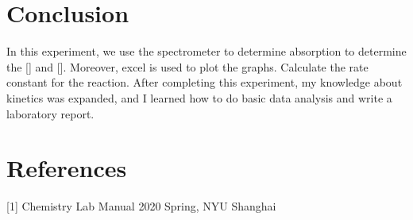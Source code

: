 \documentclass{article}
\begin{document}
\section{Conclusion}
In this experiment, we use the spectrometer to determine absorption to determine the [] and []. Moreover, excel is used to plot the graphs. Calculate the rate
constant for the reaction. After completing this experiment, my knowledge about kinetics was expanded, and I learned how to do basic data analysis and write a laboratory report.

\section{References}
[1] Chemistry Lab Manual 2020 Spring, NYU Shanghai
\end{document}
